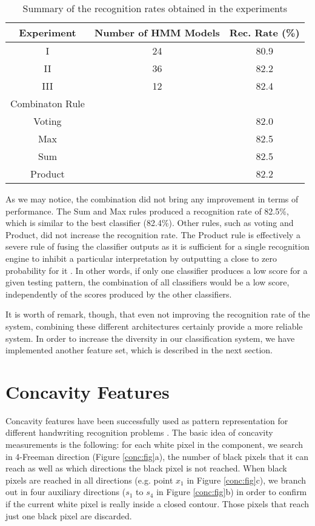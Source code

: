 \documentclass{article}[14pt, oneside, a4paper, times]
\begin{document}
\begin{table} [ht!]
\caption {Summary of the recognition rates obtained in the experiments}
\begin{center}
\begin{tabular}{ccc} \hline 
 \multicolumn{1}{c}{Experiment}&
 \multicolumn{1}{c}{Number of HMM Models} &
 \multicolumn{1}{c}{Rec. Rate (\%)} \\ \hline

I & 24 & 80.9 \\
II & 36 & 82.2 \\
III & 12 & 82.4 \\ \hline
Combinaton Rule & & \\ \hline
Voting &  & 82.0 \\
Max    &  &  82.5 \\
Sum    &  &  82.5 \\
Product&  &  82.2 \\ \hline


\end{tabular}
\label{results:tab}
\end{center}
\end{table}

As we may notice, the combination did not bring any improvement in terms of performance. The Sum and Max rules produced a recognition rate of 82.5\%, which is similar to the best classifier (82.4\%). Other rules, such as voting and Product, did not increase the recognition rate. The Product rule is effectively a severe rule of fusing the classifier outputs as it is sufficient for a single recognition engine to inhibit a particular interpretation by outputting a close to zero probability for it \cite{Kittler98}. In other words, if only one classifier produces a low score for a given testing pattern, the combination of all classifiers would be a low score, independently of the scores produced by the other classifiers.

It is worth of remark, though, that even not improving the recognition rate of the system, combining these different architectures certainly provide a more reliable system. In order to increase the diversity in our classification system, we have implemented another feature set, which is described in the next section.


\section{Concavity Features}

Concavity features have been successfully used as pattern representation for different handwriting recognition problems \cite{Liu03,Morita2004}. The basic idea of concavity measurements is the following: for each white pixel in the component, we search in 4-Freeman direction (Figure \ref{conc:fig}a), the number of black pixels that it can reach as well as which directions the black pixel is not reached. When black pixels are reached in all directions (e.g. point $x_1$ in Figure \ref{conc:fig}c), we branch out in four auxiliary directions ($s_1$ to $s_4$ in Figure \ref{conc:fig}b) in order to confirm if the current white pixel is really inside a closed contour. Those pixels that reach just one black pixel are discarded.
\end{document}
